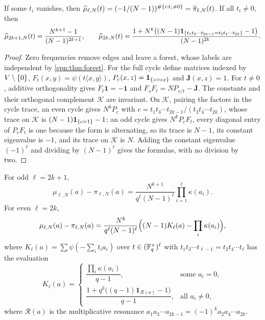 \begin{theorem}\label{spn:thm:cycle-fourier}
If some $t_i$ vanishes, then
$\widehat\mu_{\ell,N}(t)=(-1/(N-1))^{\#\{i:t_i\ne0\}}=\widehat\pi_{\ell,N}(t)$. If all $t_i\ne0$, then
\[
 \widehat\mu_{2k+1,N}(t)=\frac{N^{k+1}-1}{(N-1)^{2k+1}},\qquad
 \widehat\mu_{2k,N}(t)=\frac{1+N^k\bigl((N-1)\mathbf 1_{\{t_1t_3\cdots t_{2k-1}=t_2t_4\cdots t_{2k}\}}-1\bigr)}{(N-1)^{2k}} .
\]
\end{theorem}

\begin{proof}
Zero frequencies remove edges and leave a forest, whose labels are independent by
\cref{spn:thm:forest}. For the full cycle define matrices indexed by $V\setminus\{0\}$,
$F_t(x,y)=\psi(t\langle x,y\rangle)$, $P_c(x,z)=\mathbf 1_{\{z=cx\}}$ and $\mathbf J(x,z)=1$. For
$t\ne0$, additive orthogonality gives $F_t\mathbf 1=-\mathbf 1$ and $F_sF_t=NP_{s/t}-\mathbf J$. The
constants and their orthogonal complement $\mathcal K$ are invariant. On $\mathcal K$, pairing the
factors in the cycle trace, an even cycle gives $N^kP_c$ with
$c=t_1t_3\cdots t_{2k-1}/(t_2t_4\cdots t_{2k})$, whose trace on $\mathcal K$ is
$(N-1)\mathbf 1_{\{c=1\}}-1$; an odd cycle gives $N^kP_cF_t$, every diagonal entry of $P_cF_t$ is one
because the form is alternating, so its trace is $N-1$, its constant eigenvalue is $-1$, and its
trace on $\mathcal K$ is $N$. Adding the constant eigenvalue $(-1)^\ell$ and dividing by
$(N-1)^\ell$ gives the formulas, with no division by two.
\end{proof}

\begin{theorem}\label{spn:thm:cycle-law}
For odd $\ell=2k+1$,
\begin{equation}\label{spn:eq:cycle-odd}
 \mu_{\ell,N}(a)-\pi_{\ell,N}(a)=\frac{N^{k+1}}{q^\ell(N-1)^\ell}\prod_{i=1}^\ell\kappa(a_i).
\end{equation}
For even $\ell=2k$,
\begin{equation}\label{spn:eq:cycle-even}
 \mu_{\ell,N}(a)-\pi_{\ell,N}(a)=\frac{N^k}{q^\ell(N-1)^\ell}\Bigl((N-1)K_\ell(a)-\prod_i\kappa(a_i)\Bigr),
\end{equation}
where $K_\ell(a)=\sum\psi(-\sum_it_ia_i)$ over $t\in(\mathbb{F}_q^\times)^\ell$ with
$t_1t_3\cdots t_{\ell-1}=t_2t_4\cdots t_\ell$ has the evaluation
\[
 K_\ell(a)=\begin{cases}
 \dfrac{\prod_i\kappa(a_i)}{q-1},&\text{some }a_i=0,\\[8pt]
 \dfrac{1+q^k\bigl((q-1)\mathbf 1_{\mathcal R(a)}-1\bigr)}{q-1},&\text{all }a_i\ne0,
 \end{cases}
\]
where $\mathcal R(a)$ is the multiplicative resonance $a_1a_3\cdots a_{2k-1}=(-1)^ka_2a_4\cdots a_{2k}$.
\end{theorem}

